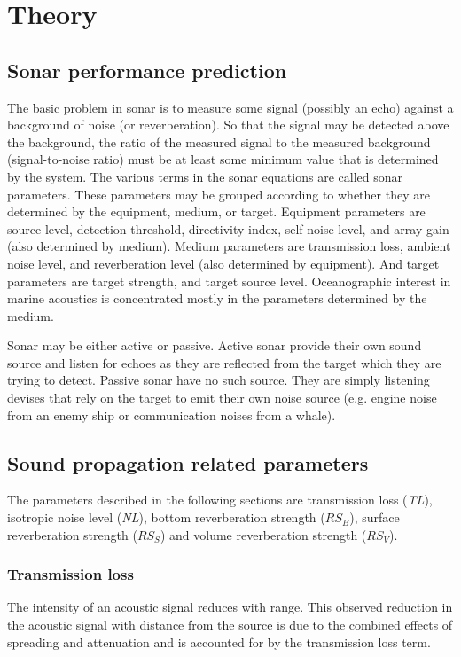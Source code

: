 \chapter{Theory} \label{Theory}

\section{ Sonar performance prediction } \label{ Sonar performance prediction }

\noindent The basic problem in sonar is to measure some signal (possibly an echo) against a background of noise (or reverberation). So that the signal may be detected above the background, the ratio of the measured signal to the measured background (signal-to-noise ratio) must be at least some minimum value that is determined by the system. The various terms in the sonar equations are called sonar parameters. These parameters may be grouped according to whether they are determined by the equipment, medium, or target. Equipment parameters are source level, detection threshold, directivity index, self-noise level, and array gain (also determined by medium). Medium parameters are transmission loss, ambient noise level, and reverberation level (also determined by equipment). And target parameters are target strength, and target source level. Oceanographic interest in marine acoustics is concentrated mostly in the parameters determined by the medium.

\noindent Sonar may be either active or passive. Active sonar provide their own sound source and listen for echoes as they are reflected from the target which they are trying to detect. Passive sonar have no such source. They are simply listening devises that rely on the target to emit their own noise source (e.g. engine noise from an enemy ship or communication noises from a whale).

\section{ Sound propagation related parameters } \label{ Sound propagation related parameters }

\noindent The parameters described in the following sections are transmission loss (\textit{TL}), isotropic noise level (\textit{NL}), bottom reverberation strength (\textit{$RS_B$}), surface reverberation strength (\textit{$RS_S$}) and volume reverberation strength (\textit{$RS_V$}).

\subsection{ Transmission loss } \label{ Transmission loss }
\noindent The intensity of an acoustic signal reduces with range. This observed reduction in the acoustic signal with distance from the source is due to the combined effects of spreading and attenuation and is accounted for by the transmission loss term.



